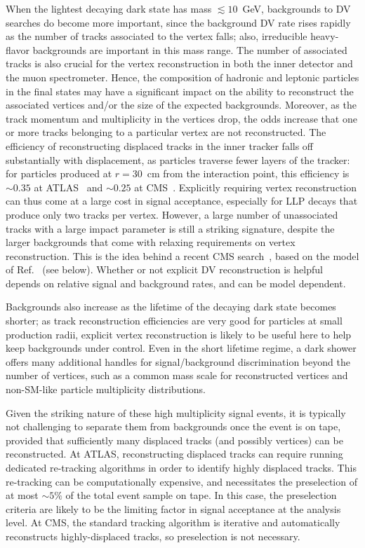 When the lightest decaying dark state has mass $\lesssim 10$~GeV, backgrounds to DV searches do become more important, since the background DV rate rises rapidly as the number of tracks associated to the vertex falls; also, irreducible heavy-flavor backgrounds are important in this mass range. The number of associated tracks is also crucial for the vertex reconstruction in both the inner detector and the muon spectrometer. Hence, the composition of hadronic and leptonic particles in the final states may have a significant impact on the ability to reconstruct the associated vertices and/or the size of the expected backgrounds. Moreover, as the track momentum and multiplicity in the vertices drop, the odds increase that one or more tracks belonging to a particular vertex are not reconstructed.
The efficiency of reconstructing displaced tracks in the inner tracker falls off substantially with displacement, as particles traverse fewer layers of the tracker: for particles produced at $r=30$~cm from the interaction point, this efficiency is $\sim 0.35$ at ATLAS~\cite{ATL-PHYS-PUB-2017-014} and $\sim 0.25$ at CMS~\cite{Rovere:2134627}. Explicitly requiring vertex reconstruction can thus come at a large cost in signal acceptance, especially for LLP decays that produce only two tracks per vertex. However, a large number of unassociated tracks with a large impact parameter is still a striking signature, despite the larger backgrounds that come with relaxing requirements on vertex reconstruction. This is the idea behind a recent CMS search~\cite{Sirunyan:2018njd}, based on the model of Ref.~\cite{Schwaller:2015gea} (see below). Whether or not explicit DV reconstruction is helpful depends on relative signal and background rates, and can be model dependent.

Backgrounds also increase as the lifetime of the decaying dark state becomes shorter; as track reconstruction efficiencies are very good for particles at small production radii, explicit vertex reconstruction is likely to be useful here to help keep backgrounds under control. Even in the short lifetime regime, a dark shower offers many additional handles for signal/background discrimination beyond the number of vertices, such as a common mass scale for reconstructed vertices and non-SM-like particle multiplicity distributions.

Given the striking nature of these high multiplicity signal events, it is typically not challenging to separate them from backgrounds once the event is on tape, provided that sufficiently many displaced tracks (and possibly vertices) can be reconstructed. At ATLAS, reconstructing displaced tracks can require running dedicated re-tracking algorithms in order to identify highly displaced tracks. This re-tracking can be computationally expensive, and necessitates the preselection of at most $\sim 5\%$ of the total event sample on tape.
In this case, the preselection criteria are likely to be the limiting factor in signal acceptance at the analysis level. At CMS, the standard tracking algorithm is iterative and automatically reconstructs highly-displaced tracks, so preselection is not necessary. 


